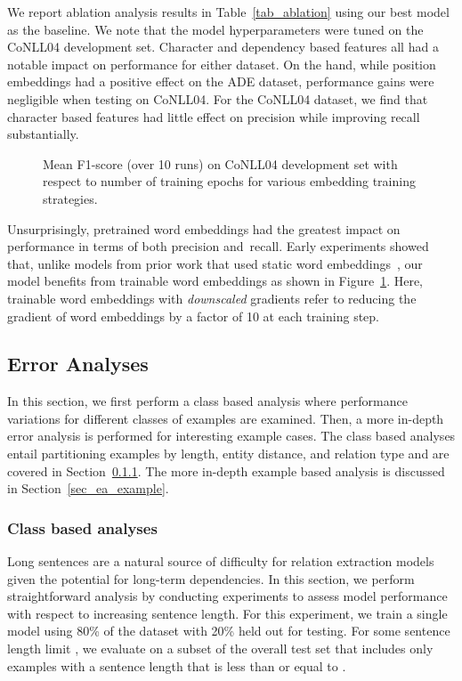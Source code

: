 \documentclass{clv3}
\begin{document}
We report  ablation analysis results in Table~\ref{tab_ablation} using our best model as the baseline. We note that the model hyperparameters were tuned on the CoNLL04 development set. Character and dependency based features all had a notable impact on performance for either dataset. On the hand, while position embeddings had a positive effect on the ADE dataset, performance gains were negligible when testing on  CoNLL04. For the CoNLL04 dataset, we find that character based features had little effect on precision while improving recall substantially. 

\begin{figure}[bt]
  \caption{Mean F1-score (over 10 runs) on CoNLL04 development set with respect to number of training epochs for various embedding training strategies.}
  \label{fig_emb_plot}
\end{figure}

Unsurprisingly, pretrained word embeddings had the greatest impact on performance in terms of both precision and~recall. Early experiments showed that, unlike models from prior work that used static word embeddings~\cite{li2017neural,bekoulis2018adversarial}, our model benefits from trainable word embeddings as shown in Figure~\ref{fig_emb_plot}. Here, trainable word embeddings with \emph{downscaled} gradients refer to reducing the gradient of word embeddings by a factor of 10 at each training step. 

\subsection{Error Analyses}
\label{sec-s-ea}

In this section, we first perform a class based analysis where performance variations for different classes of examples are examined. Then, a more in-depth error analysis is performed for interesting example cases. The class based  analyses entail partitioning examples by length, entity distance, and relation type and are covered in Section~\ref{sec_ea_class}. The more in-depth example based analysis is discussed in Section~\ref{sec_ea_example}.

\subsubsection{Class based analyses}\label{sec_ea_class} 
Long sentences are a natural source of difficulty for relation extraction models given the potential for long-term dependencies. In this section, we perform straightforward  analysis by conducting experiments to assess model performance with respect to increasing sentence length. For this experiment, we train a single model using 80\% of the dataset with 20\% held out for testing. For some sentence length limit , we evaluate on a subset of the overall test set that includes only examples with a sentence length that is less than or equal to . 
\end{document}
